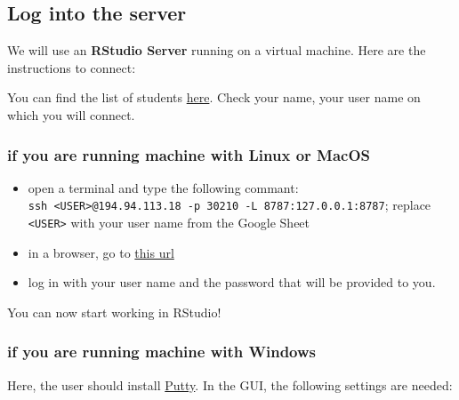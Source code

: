 \documentclass[
]{book}
\providecommand{\tightlist}{%
  \setlength{\itemsep}{0pt}\setlength{\parskip}{0pt}}
\begin{document}
\hypertarget{log-into-the-server}{%
\subsection*{Log into the server}\label{log-into-the-server}}

We will use an \textbf{RStudio Server} running on a virtual machine.
Here are the instructions to connect:

You can find the list of students \href{https://docs.google.com/spreadsheets/d/1eMCr4b6UcOPIG8tJkfoEkMoZzJycWJPMYN5nMZWiU48/edit?usp=sharing}{here}.
Check your name, your user name on which you will connect.

\hypertarget{if-you-are-running-machine-with-linux-or-macos}{%
\subsubsection*{if you are running machine with Linux or MacOS}\label{if-you-are-running-machine-with-linux-or-macos}}

\begin{itemize}
\tightlist
\item
  open a terminal and type the following commant: \texttt{ssh\ \textless{}USER\textgreater{}@194.94.113.18\ -p\ 30210\ -L\ 8787:127.0.0.1:8787}; replace \texttt{\textless{}USER\textgreater{}} with your user name from the Google Sheet
\item
  in a browser, go to \href{http://127.0.0.1:8787}{this url}
\item
  log in with your user name and the password that will be provided to you.
\end{itemize}

You can now start working in RStudio!

\hypertarget{if-you-are-running-machine-with-windows}{%
\subsubsection*{if you are running machine with Windows}\label{if-you-are-running-machine-with-windows}}

Here, the user should install \href{https://www.putty.org/}{Putty}.
In the GUI, the following settings are needed:
\end{document}

